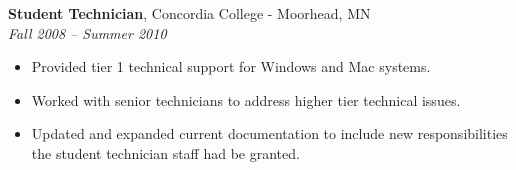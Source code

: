 {\bf Student Technician}, Concordia College - Moorhead, MN\\
{\it Fall 2008 – Summer 2010}
\begin{itemize}
	\item Provided tier 1 technical support for Windows and Mac systems.
	\item Worked with senior technicians to address higher tier technical issues.
	\item Updated and expanded current documentation to include new responsibilities the student technician staff had be granted.
\end{itemize}